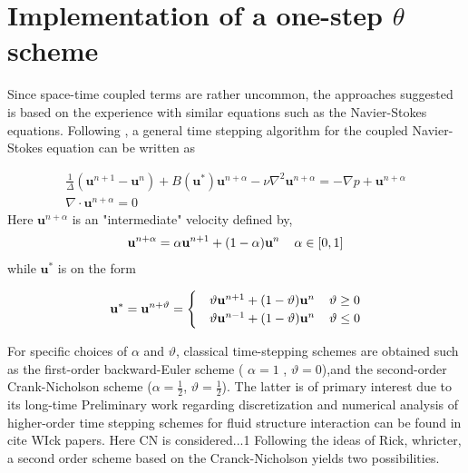 \section{Implementation of a one-step $\theta$ scheme} 
Since space-time coupled terms are rather uncommon, the approaches suggested is based on the experience with similar equations such as the Navier-Stokes equations. Following \cite{Simo1994},  a general time stepping algorithm for the coupled Navier-Stokes equation can be written as

\begin{align*}
\frac{1}{\Delta}(\mathbf{u}^{n+1} - \mathbf{u}^{n}) + 
B(\mathbf{u}^{*})\mathbf{u}^{n+\alpha}
- \nu \nabla^2 \mathbf{u}^{n + \alpha} = - \nabla p + \mathbf{u}^{n+\alpha} \\
\nabla \cdot \mathbf{u}^{n+\alpha} = 0 
\end{align*} 
Here $\mathbf{u}^{n+\alpha}$ is an "intermediate" velocity defined by,
\begin{align*}
\mathbf{u}^{n+\alpha} = \alpha\mathbf{u}^{n+1} + (1 - \alpha)\mathbf{u}^{n} 
\hspace{4mm} \alpha \in [0, 1]
\end{align*}
while $\mathbf{u}^{*}$ is on the form

\begin{align*}
\mathbf{u}^{*} =   \mathbf{u}^{n+ \vartheta} =
\begin{cases} 
   &\vartheta \mathbf{u}^{n+1} + (1 - \vartheta)\mathbf{u}^{n} \hspace{4mm} \vartheta \geq 0 \\ 
   &\vartheta \mathbf{u}^{n-1} + (1 - \vartheta)\mathbf{u}^{n} \hspace{4mm} \vartheta \leq 0
   \end{cases}
\end{align*}

For specific choices of $\alpha$ and $\vartheta$, classical time-stepping schemes are obtained such as the  first-order backward-Euler scheme ( $\alpha = 1$ , $\vartheta = 0$),and the second-order Crank-Nicholson scheme ($\alpha = \frac{1}{2}$,  $\vartheta = \frac{1}{2}$). The latter is of primary interest due to its 
long-time 
Preliminary work regarding discretization and numerical analysis of higher-order time stepping schemes for fluid structure interaction can be found in cite WIck papers. Here CN is considered...1 Following the ideas of Rick, whricter, a second order scheme based on the Cranck-Nicholson yields two possibilities.





